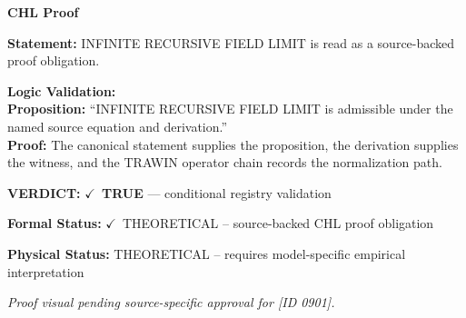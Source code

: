 \vspace{0.45em}
\noindent\textbf{CHL Proof}\par
\textbf{Statement:} INFINITE RECURSIVE FIELD LIMIT is read as a source-backed proof obligation.

\textbf{Logic Validation:}\\
\textbf{Proposition:} ``INFINITE RECURSIVE FIELD LIMIT is admissible under the named source equation and derivation.''\\
\textbf{Proof:} The canonical statement supplies the proposition, the derivation supplies the witness, and the TRAWIN operator chain records the normalization path.

\textbf{VERDICT:} \ensuremath{\checkmark}\ \textbf{TRUE} --- conditional registry validation

\textbf{Formal Status:} \ensuremath{\checkmark}\ THEORETICAL -- source-backed CHL proof obligation

\textbf{Physical Status:} THEORETICAL -- requires model-specific empirical interpretation
\par\vspace{0.45em}
\par
\vfill
\begingroup\footnotesize\itshape
Proof visual pending source-specific approval for [ID 0901].
\par\endgroup
\vfill
\endgroup
\endgroup
